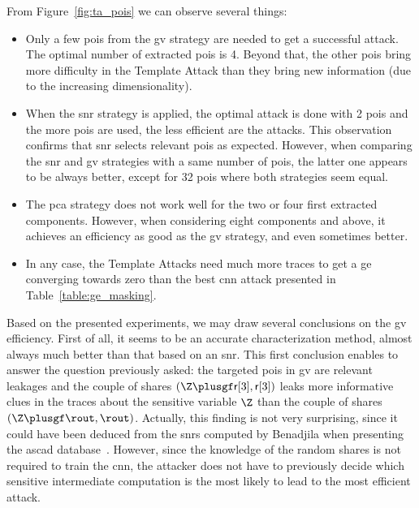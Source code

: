 From Figure~\ref{fig:ta_pois} we can observe several things:
\begin{itemize}
	\item Only a few \glspl{poi} from the \gls{gv} strategy are needed to get a successful attack.
	The optimal number of extracted \glspl{poi} is 4.
    Beyond that, the other \glspl{poi} bring more difficulty in the Template Attack than they bring new information (due to the increasing dimensionality).
	\item When the \gls{snr} strategy is applied, the optimal attack is done with 2 \glspl{poi} and the more \glspl{poi} are used, the less efficient are the attacks.
	This observation confirms that \gls{snr} selects relevant \glspl{poi} as expected. 
	However, when comparing the \gls{snr} and \gls{gv} strategies with a same number of \glspl{poi}, the latter one appears to be always better, except for 32 \glspl{poi} where both strategies seem equal.
	\item The \gls{pca} strategy does not work well for the two or four first extracted components.
    However, when considering eight components and above, it achieves an efficiency as good as the \gls{gv} strategy, and even sometimes better.
	\item In any case, the Template Attacks need much more traces to get a \gls{ge} converging towards zero than the best \gls{cnn} attack presented in Table~\ref{table:ge_masking}.
\end{itemize}

Based on the presented experiments, we may draw several conclusions on the \gls{gv} efficiency.
First of all, it seems to be an accurate characterization method, almost always much better than that based on an \gls{snr}.
This first conclusion enables to answer the question previously asked: the targeted \glspl{poi} in \gls{gv} are relevant leakages and the couple of shares \((\Z \plusgf \mathsf{r}[3], \mathsf{r}[3])\) leaks more informative clues in the traces about the sensitive variable \(\Z\) than the couple of shares \((\Z \plusgf \rout, \rout)\).
Actually, this finding is not very surprising, since it could have been deduced from the \glspl{snr} computed by Benadjila \etal{} when presenting the \gls{ascad} database~\cite{prouff_study_2018}.
However, since the knowledge of the random shares is not required to train the \gls{cnn}, the attacker does not have to previously decide which sensitive intermediate computation is the most likely to lead to the most efficient attack.

